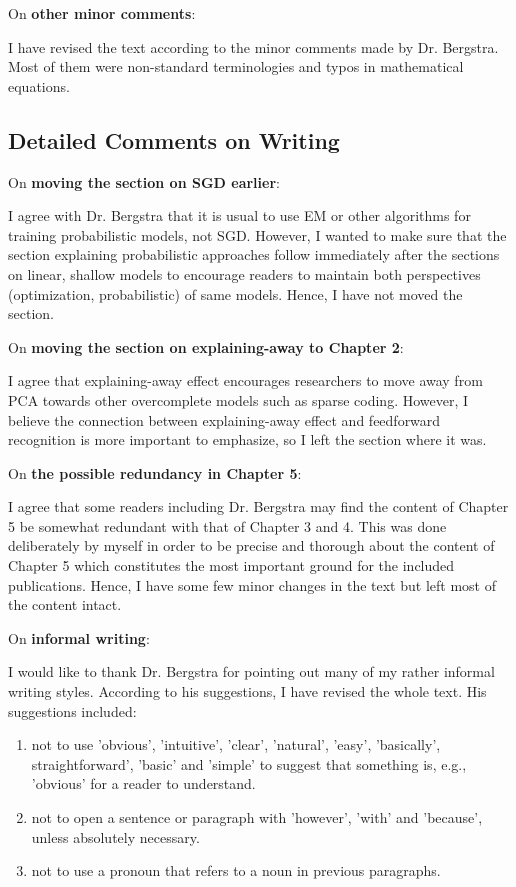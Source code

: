 \documentclass[11pt, oneside]{essay}
\begin{document}
On \textbf{other minor comments}:

I have revised the text according to the minor comments made by
Dr. Bergstra. Most of them were non-standard terminologies
and typos in mathematical equations. 


\subsection{Detailed Comments on Writing}

On \textbf{moving the section on SGD earlier}:

I agree with Dr. Bergstra that it is usual to use EM or
other algorithms for training probabilistic models, not SGD.
However, I wanted to make sure that the section explaining
probabilistic approaches follow immediately after the
sections on linear, shallow models to encourage readers
to maintain both perspectives (optimization, probabilistic)
of same models. Hence, I have not moved the section.

On \textbf{moving the section on explaining-away to Chapter 2}:

I agree that explaining-away effect encourages
researchers to move away from PCA towards other overcomplete
models such as sparse coding. However, I believe the
connection between explaining-away effect and feedforward
recognition is more important to emphasize, so I left the
section where it was.

On \textbf{the possible redundancy in Chapter 5}:

I agree that some readers including Dr. Bergstra may find
the content of Chapter 5 be somewhat redundant with that of
Chapter 3 and 4. This was done deliberately by myself in
order to be precise and thorough about the content of
Chapter 5 which constitutes the most important ground for
the included publications. Hence, I have some few minor
changes in the text but left most of the content intact.

On \textbf{informal writing}:

I would like to thank Dr. Bergstra for pointing out many of
my rather informal writing styles. According to his
suggestions, I have revised the whole text. His suggestions
included:
\begin{enumerate}
    \item not to use 'obvious', 'intuitive', 'clear',
        'natural', 'easy', 'basically', straightforward',
        'basic' and 'simple' to suggest that something is,
        e.g., 'obvious' for a reader to understand.
    \item not to open a sentence or paragraph with
        'however', 'with' and 'because', unless absolutely
        necessary.
    \item not to use a pronoun that refers to a noun in
        previous paragraphs.
\end{enumerate}
\end{document}
